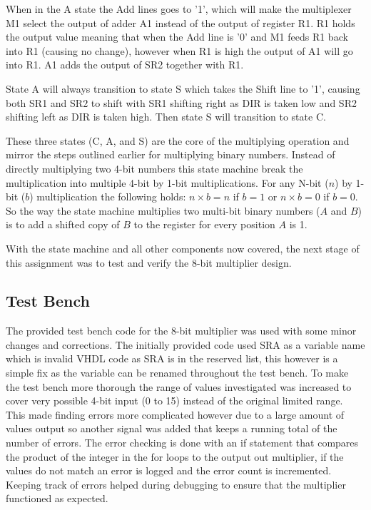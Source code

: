 \documentclass[11pt]{article}
\begin{document}
When in the A state the Add lines goes to '1', which will make the multiplexer M1 select the output of adder A1 instead of the output of register R1.
R1 holds the output value meaning that when the Add line is '0' and M1 feeds R1 back into R1 (causing no change), however when R1 is high the output of A1 will go into R1.
A1 adds the output of SR2 together with R1.

State A will always transition to state S which takes the Shift line to '1', causing both SR1 and SR2 to shift with SR1 shifting right as DIR is taken low and SR2 shifting left as DIR is taken high.
Then state S will transition to state C.

These three states (C, A, and S) are the core of the multiplying operation and mirror the steps outlined earlier for multiplying binary numbers.
Instead of directly multiplying two 4-bit numbers this state machine break the multiplication into multiple 4-bit by 1-bit multiplications.
For any N-bit ($n$) by 1-bit ($b$) multiplication the following holds: $n \times b = n$ if $b = 1$ or $n \times b = 0$ if $b = 0$.
So the way the state machine multiplies two multi-bit binary numbers ($A$ and $B$) is to add a shifted copy of $B$ to the register for every position $A$ is 1\cite{dally}. 

With the state machine and all other components now covered, the next stage of this assignment was to test and verify the 8-bit multiplier design.

\subsection{Test Bench}
The provided test bench code for the 8-bit multiplier was used with some minor changes and corrections.
The initially provided code used SRA as a variable name which is invalid VHDL code as SRA is in the reserved list,
this however is a simple fix as the variable can be renamed throughout the test bench.
To make the test bench more thorough the range of values investigated was increased to cover very possible 4-bit input (0 to 15) instead of the original limited range.
This made finding errors more complicated however due to a large amount of values output so another signal was added that keeps a running total of the number of errors.
The error checking is done with an if statement that compares the product of the integer in the for loops to the output out multiplier,
if the values do not match an error is logged and the error count is incremented. 
Keeping track of errors helped during debugging to ensure that the multiplier functioned as expected. 
\end{document}
